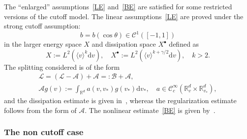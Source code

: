 \documentclass[10pt]{amsart}
\theoremstyle{definition}\newtheorem{defi}[theo]{Definition}\newtheorem{rema}[theo]{Remark}\newtheorem{exam}[theo]{Example}\newtheorem{exem}[theo]{Example}\newtheorem{nota}[theo]{Notation}
\renewcommand{\d}{\mathrm{d}}
\newcommand{\R}{\mathbb{R}}
\renewcommand{\AA}{\mathcal{A}}
\newcommand{\BB}{\mathcal{B}}
\newcommand{\CC}{\mathcal{C}}
\newcommand{\LL}{\mathcal{L}}
\newcommand{\Sl}{X}
\newcommand{\Slp}{X^{\bullet}}
\newcommand{\la}{\langle}
\newcommand{\ra}{\rangle}
\begin{document}
The ``enlarged'' assumptions~\eqref{LE} and~\eqref{BE} are satisfied for some restricted versions of the cutoff model. The linear assumptions~\eqref{LE} are proved under the strong cutoff assumption:
\[
b =b(\cos \theta) \in \CC^1\left([-1, 1] \right)
\]
in the larger energy space $\Sl$ and dissipation space $\Slp$ defined as
\[
\Sl := L^2\left(\la v \ra^k \d v \right), \quad \Slp := L^2\left(\la v \ra^{k+\gamma/2} \d v\right), \quad k > 2.
\]
The splitting considered is of the form
\begin{gather*}
\LL = (\LL - \AA) + \AA =: \BB+ \AA,\\
\AA g(v) := \int_{\R^d} a(v, v_*) g(v_*) \d v_*, \quad a \in \CC^\infty_c\left(\R^d_v \times \R^d_{v_*} \right),
\end{gather*}
and the dissipation estimate is given in~\cite[Lemma~3.4]{BMM2019}, whereas the regularization estimate follows from the form of $\AA$. The nonlinear estimate~\ref{BE} is given by~\cite[Lemma~4.4]{BMM2019}.

\subsubsection{The non cutoff case}
\end{document}
